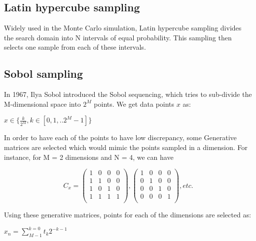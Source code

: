 \subsection{Latin hypercube sampling}
Widely used in the Monte Carlo simulation, Latin hypercube sampling divides the search domain into N intervals of equal probability. This sampling then selects one sample from each of these intervals. 

\subsection{Sobol sampling}

In 1967, Ilya Sobol introduced the Sobol sequencing, which tries to sub-divide the M-dimensional space into $2^M$ points. We get data points $x$ as:

\begin{center}
$x \in \Big \{\displaystyle \frac{k}{2^M}, k \in [0,1,..2^M-1] \Big \}$
\end{center}

\noindent
In order to have each of the points to have low discrepancy, some Generative matrices are selected which would mimic the points sampled in a dimension. For instance, for M = 2 dimensions and N = 4, we can have
\begin{singlespace}
\[C_{x} = 
\begin{pmatrix}
    1 & 0 & 0 & 0       \\
    1 & 1 & 0 & 0       \\
    1 & 0 & 1 & 0       \\
    1 & 1 & 1 & 1       \\
    
\end{pmatrix}
, 
\begin{pmatrix}
    1 & 0 & 0 & 0       \\
    0 & 1 & 0 & 0       \\
    0 & 0 & 1 & 0       \\
    0 & 0 & 0 & 1       \\
      
\end{pmatrix}
, etc.
\]
\end{singlespace}
\bigskip
\noindent
Using these generative matrices, points for each of the dimensions are selected as:
\begin{center}
$x_{n} = \displaystyle \sum_{M-1}^{k=0} t_{k}2^{-k-1}$
\end{center}

